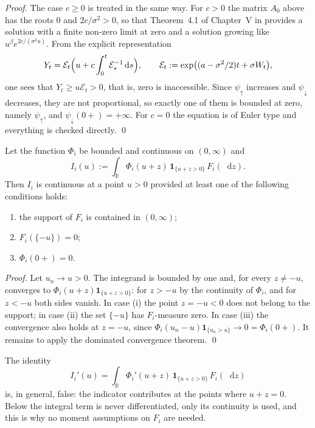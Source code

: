 \documentclass[smallextended]{svjour3}
\newcommand{\bbr}{\mathbb{R}}
\newcommand{\Ind}{\mathbf{1}}
\newcommand{\diff}{\mathop{}\!\mathrm{d}}
\newcommand{\pup}{\psi_{\uparrow}}
\newcommand{\pdn}{\psi_{\downarrow}}
\begin{document}
\begin{proof}
The case $c\ge0$ is treated in the same way. For $c>0$ the matrix $A_0$ above
has the roots $0$ and $2c/\sigma^2>0$, so that Theorem~4.1 of Chapter~V in
\cite{Coddington} provides a solution with a finite non-zero limit at zero and
a solution growing like $u^{\beta}e^{2c/(\sigma^2u)}$. From the explicit
representation
\begin{equation}
    \label{eq:Yexpl}
    Y_t=\mathcal E_t\Bigl(u+c\int_0^t\mathcal E_s^{-1}\diff s\Bigr) ,
    \qquad
    \mathcal E_t:=\exp\bigl((a-\sigma^2/2)t+\sigma W_t\bigr) ,
\end{equation}
one sees that $Y_t\ge u\mathcal E_t>0$, that is, zero is inaccessible. Since
$\pup$ increases and $\pdn$ decreases, they are not proportional, so exactly
one of them is bounded at zero, namely $\pup$, and $\pdn(0+)=+\infty$. For
$c=0$ the equation is of Euler type and everything is checked directly.
\qed
\end{proof}

\begin{lemma}
\label{lem:convolution}
Let the function $\Phi_i$ be bounded and continuous on $(0,\infty)$ and
$$
I_i(u):=\int_{\bbr}\Phi_i(u+z)\,\Ind_{\{u+z>0\}}\,F_i(\diff z).
$$
Then $I_i$ is continuous at a point $u>0$ provided at least one of the
following conditions holds:
\begin{enumerate}
\item[\rm(i)] the support of $F_i$ is contained in $(0,\infty)$;
\item[\rm(ii)] $F_i(\{-u\})=0$;
\item[\rm(iii)] $\Phi_i(0+)=0$.
\end{enumerate}
\end{lemma}

\begin{proof}
Let $u_n\to u>0$. The integrand is bounded by one and, for every $z\ne-u$,
converges to $\Phi_i(u+z)\Ind_{\{u+z>0\}}$: for $z>-u$ by the continuity of
$\Phi_i$, and for $z<-u$ both sides vanish. In case {\rm(i)} the point
$z=-u<0$ does not belong to the support; in case {\rm(ii)} the set $\{-u\}$ has
$F_i$-measure zero. In case {\rm(iii)} the convergence also holds at $z=-u$,
since $\Phi_i(u_n-u)\Ind_{\{u_n>u\}}\to0=\Phi_i(0+)$. It remains to apply the
dominated convergence theorem.
\qed
\end{proof}

\begin{remark}
\label{rem:nodiff}
The identity
$$
I_i'(u)=\int_{\bbr}\Phi_i'(u+z)\,\Ind_{\{u+z>0\}}\,F_i(\diff z)
$$
is, in general, false: the indicator contributes at the points where $u+z=0$.
Below the integral term is never differentiated, only its continuity is used,
and this is why no moment assumptions on $F_i$ are needed.
\end{remark}
\end{document}
